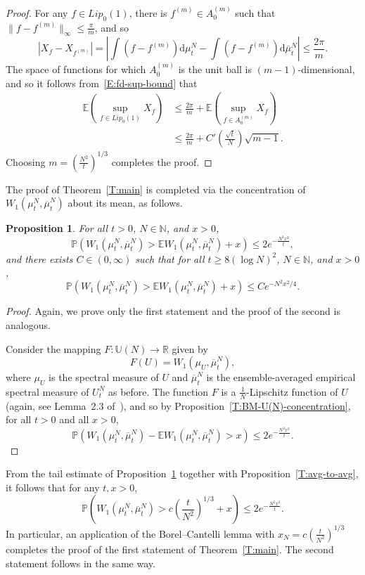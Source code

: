 \documentclass[11pt]{article}
\newtheorem{prop}[theo]{Proposition}
\theoremstyle{definition}
\numberwithin{equation}{section}
\numberwithin{figure}{section}
\numberwithin{table}{section}
\newcommand{\Unitary}[1]{\mathbb{U}\left(#1\right)}
\newcommand{\R}{\mathbb{R}}
\newcommand{\E}{\mathbb{E}}
\newcommand{\Prob}{\mathbb{P}}
\newcommand*{\dd}{\mathrm{d}}
\newcommand*{\dmu}{\dd \mu}
\newcommand*{\dbmu}{\dd \overline{\mu}}
\begin{document}
\begin{proof}
For any $f\in Lip_0(1)$, there is $f^{(m)}\in A^{(m)}_0$ such that $\|f-f^{(m)}\|_\infty\le \frac{\pi}{m}$, and so
\[
\left|X_f-X_{f^{(m)}}\right|=\left|\int(f-f^{(m)})\dmu^N_t-\int(f-f^{(m)})\dbmu^N_t\right|\le\frac{2\pi}{m}.
\]
The space of functions for which $A^{(m)}_0$ is the unit ball is $(m-1)$-dimensional, and so it follows from~\eqref{E:fd-sup-bound} that
\begin{align*}
\E\left(\sup_{f\in Lip_0(1)}X_f\right) &\le \frac{2\pi}{m}+\E\left(\sup_{f\in A^{(m)}_0}X_f\right)\\
&\le\frac{2\pi}{m}+C'\left(\frac{\sqrt{t}}{N}\right)\sqrt{m-1}.
\end{align*}
Choosing $m=\left(\frac{N^2}{t}\right)^{1/3}$ completes the proof.
\end{proof}

The proof of Theorem~\ref{T:main} is completed via the concentration of $W_1(\mu^N_t,\overline{\mu}^N_t)$ about its mean, as follows.

\begin{prop}\label{T:W_1-concentration}
For all $t>0$, $N\in\mathbb{N}$, and $x>0$,
\[
\Prob\left(W_1(\mu^N_t,\overline{\mu}^N_t)>\E W_1(\mu^N_t,\overline{\mu}^N_t)+x\right)
\le 2e^{-\frac{N^2x^2}{t}},
\]
and there exists $C\in(0,\infty)$ such that for all $t\ge 8(\log N)^2$, $N\in\mathbb{N}$, and $x>0$,
\[
\Prob\left(W_1(\mu^N_t,\overline{\mu}^N_t)>\E W_1(\mu^N_t,\overline{\mu}^N_t)+x\right)
\le C e^{-N^2x^2/4}.
\]
\end{prop}

\begin{proof}
Again, we prove only the first statement and the proof of the second is analogous.

Consider the mapping $F:\Unitary{N}\to\R$ given by
\[
F(U)=W_1(\mu_U,\overline{\mu}^N_t),
\]
where $\mu_U$ is the spectral measure of $U$ and $\overline{\mu}^N_t$ is the ensemble-averaged empirical spectral measure of $U^N_t$ as before. The function $F$ is a $\frac{1}{N}$-Lipschitz function of $U$ (again, see Lemma~2.3 of~\cite{MM-PTRF-2013}), and so by Proposition~\ref{T:BM-U(N)-concentration}, for all $t>0$ and all $x>0$,
\[
\Prob\left(W_1(\mu^N_t,\overline{\mu}^N_t)-\E W_1(\mu^N_t,\overline{\mu}^N_t)>x\right)\le 2e^{-\frac{N^2x^2}{t}}.
\]
\end{proof}

From the tail estimate of Proposition~\ref{T:W_1-concentration} together with Proposition~\ref{T:avg-to-avg}, it follows that for any $t,x>0$,
\begin{equation}\label{E:dist-to-avg-tail-bound}
\Prob\left(W_1(\mu^N_t,\overline{\mu}^N_t)> c\left(\frac{t}{N^2}\right)^{1/3} + x\right)\le
2e^{-\frac{N^2x^2}{t}}.
\end{equation}
In particular, an application of the Borel--Cantelli lemma with $x_N=c\left(\frac{t}{N^2}\right)^{1/3}$ completes the proof of the first statement of Theorem~\ref{T:main}. The second statement follows in the same way.
\end{document}
